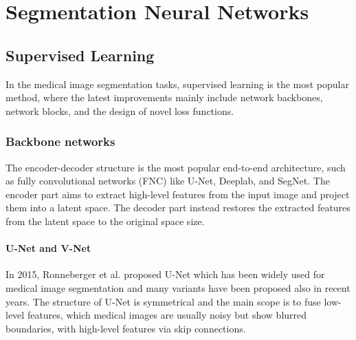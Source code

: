 
\chapter{Segmentation Neural Networks}

\label{chp:segmentation}

\def\:{\hskip0pt} %


\section{Supervised Learning}
In the medical image segmentation tasks, supervised learning is the most popular
method, where the latest improvements mainly include network backbones, network
blocks, and the design of novel loss functions.

\subsection{Backbone networks}
The encoder-decoder structure is the most popular end-to-end architecture, such
as fully convolutional networks (FNC) like U-Net, Deeplab, and SegNet. The
encoder part aims to extract high-level features from the input image and
project them into a latent space. The decoder part instead restores the
extracted features
from the latent space to the original space size.

\subsubsection{U-Net and V-Net}
In 2015, Ronneberger et al. \cite{ronneberger2015unet} proposed U-Net which has
been widely used for medical image segmentation and many variants have been
proposed also in recent years. The structure of U-Net is symmetrical and the
main scope is to fuse low-level features, which medical images are usually noisy
but show blurred boundaries, with high-level features via skip connections.


